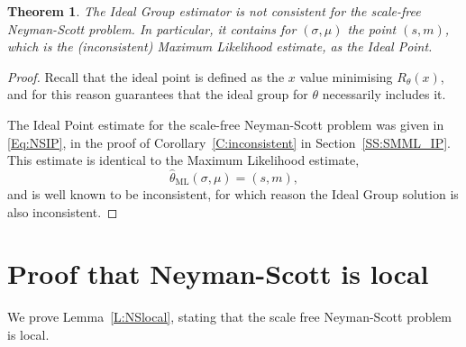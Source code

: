 \documentclass{IEEEtran}
\newtheorem{thm}{Theorem}
\begin{document}
\begin{thm}\label{T:IG}
The Ideal Group estimator is not consistent for the scale-free
Neyman-Scott problem. In particular, it contains for $(\sigma,\mu)$
the point $(s,m)$, which is the (inconsistent) Maximum Likelihood estimate,
as the Ideal Point.
\end{thm}

\begin{proof}
Recall that the ideal point is defined as the $x$ value
minimising $R_{\theta}(x)$, and for this reason guarantees that
the ideal group for $\theta$ necessarily includes it.

The Ideal Point estimate for the scale-free Neyman-Scott problem was given
in \eqref{Eq:NSIP}, in the proof of Corollary~\ref{C:inconsistent} in
Section~\ref{SS:SMML_IP}.
This estimate is identical to the Maximum Likelihood estimate,
\[
\hat{\theta}_{\text{ML}}(\sigma,\mu)=(s,m),
\]
and is well known to be inconsistent, for which reason the Ideal Group solution
is also inconsistent.
\end{proof}

\section{Proof that Neyman-Scott is local}\label{S:NSlocal}

We prove Lemma~\ref{L:NSlocal}, stating that the
scale free Neyman-Scott problem is local.
\end{document}
